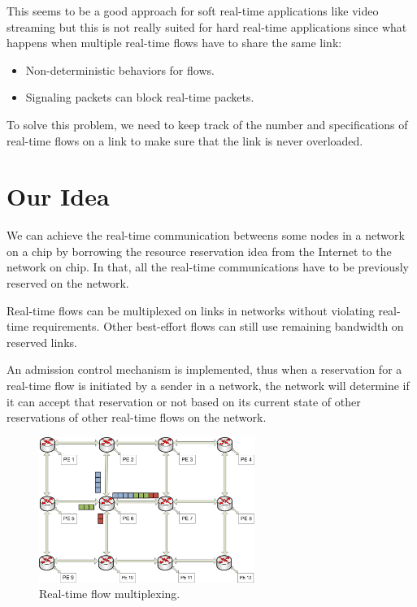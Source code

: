 \documentclass[a4]{article}
\begin{document}
This seems to be a good approach for soft real-time applications like video streaming
but this is not really suited for hard real-time applications since what happens 
when multiple real-time flows have to share the same link:
\begin{itemize}
\item Non-deterministic behaviors for flows.
\item Signaling packets can block real-time packets.
\end{itemize}
To solve this problem, we need to keep track of the number and specifications of
real-time flows on a link to make sure that the link is never overloaded.

\section{Our Idea}
We can achieve the real-time communication betweens some nodes in a network 
on a chip by borrowing the resource reservation idea \cite{Zhang93rsvp} from the 
Internet to the network on chip. In that, all the real-time communications 
have to be previously reserved on the network. 

Real-time flows can be multiplexed \cite{Ferrari90ascheme, Zhang_1service} on
links in networks without violating real-time requirements. Other best-effort
flows can still use remaining bandwidth on reserved links.

An admission control mechanism is implemented, thus when a reservation 
for a real-time flow is initiated by a sender in a network, the network will determine if 
it can accept that reservation or not based on its current state of other 
reservations of other real-time flows on the network.

\begin{figure}[htbp]
\centering
\includegraphics[width=7cm]{pics/Multiplex2}
\caption[Real time flow multiplexing.]
{Real-time flow multiplexing.}\label{fig:FlowMultiplex}
\end{figure}
\end{document}
